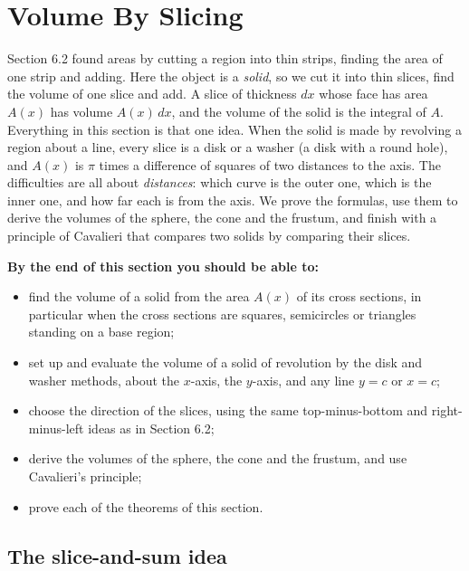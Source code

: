 \documentclass[11pt]{article}
\begin{document}
\section{Volume By Slicing}

\begin{guide}
Section 6.2 found areas by cutting a region into thin strips, finding the area of one strip and adding. Here the object is a \emph{solid}, so we cut it into thin slices, find the volume of one slice and add. A slice of thickness $dx$ whose face has area $A(x)$ has volume $A(x)\,dx$, and the volume of the solid is the integral of $A$. Everything in this section is that one idea. When the solid is made by revolving a region about a line, every slice is a disk or a washer (a disk with a round hole), and $A(x)$ is $\pi$ times a difference of squares of two distances to the axis. The difficulties are all about \emph{distances}: which curve is the outer one, which is the inner one, and how far each is from the axis. We prove the formulas, use them to derive the volumes of the sphere, the cone and the frustum, and finish with a principle of Cavalieri that compares two solids by comparing their slices.
\end{guide}

\textbf{By the end of this section you should be able to:}
\begin{itemize}
  \item find the volume of a solid from the area $A(x)$ of its cross sections, in particular when the cross sections are squares, semicircles or triangles standing on a base region;
  \item set up and evaluate the volume of a solid of revolution by the disk and washer methods, about the $x$-axis, the $y$-axis, and any line $y=c$ or $x=c$;
  \item choose the direction of the slices, using the same top-minus-bottom and right-minus-left ideas as in Section 6.2;
  \item derive the volumes of the sphere, the cone and the frustum, and use Cavalieri's principle;
  \item prove each of the theorems of this section.
\end{itemize}

\subsection*{The slice-and-sum idea}
\end{document}
